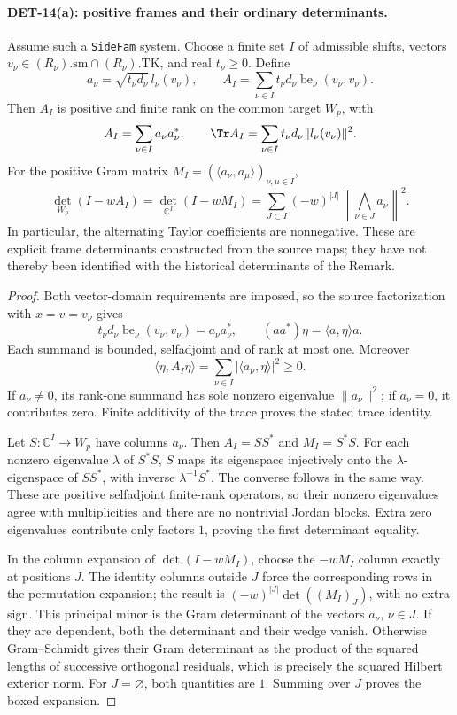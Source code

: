 \paragraph{DET-14(a): positive frames and their ordinary determinants.}
Assume such a \texttt{SideFam} system. Choose a finite set \(I\) of
admissible shifts, vectors
\(v_\nu\in(R_\nu).\mathrm{sm}\cap(R_\nu).\mathrm{TK}\), and
real \(t_\nu\ge0\). Define
\[
 a_\nu=\sqrt{t_\nu d_\nu}\,l_\nu(v_\nu),\qquad
 A_I=\sum_{\nu\in I}t_\nu d_\nu
                \operatorname{be}_\nu(v_\nu,v_\nu).
\]
Then \(A_I\) is positive and finite rank on the common target \(W_p\),
with
\[
 A_I=\sum_{\nu\in I}a_\nu a_\nu^*,\qquad
 \Tr A_I=\sum_{\nu\in I}t_\nu d_\nu\|l_\nu(v_\nu)\|^2.
\]
For the positive Gram matrix
\(M_I=(\langle a_\nu,a_\mu\rangle)_{\nu,\mu\in I}\),
\[
 \boxed{\quad
 \det_{W_p}(I-wA_I)=\det_{\mathbb C^I}(I-wM_I)
 =\sum_{J\subset I}(-w)^{|J|}
       \left\|\bigwedge_{\nu\in J}a_\nu\right\|^2.\quad}
\]
In particular, the alternating Taylor coefficients are nonnegative.
These are explicit frame determinants constructed from the source
maps; they have not thereby been identified with the historical
determinants of the Remark.
\begin{proof}
Both vector-domain requirements are imposed, so the source
factorization with \(x=v=v_\nu\) gives
\[
 t_\nu d_\nu\operatorname{be}_\nu(v_\nu,v_\nu)
 =a_\nu a_\nu^*,\qquad
 (aa^*)\eta=\langle a,\eta\rangle a.
\]
Each summand is bounded, selfadjoint and of rank at most one.
Moreover
\[
 \langle\eta,A_I\eta\rangle
 =\sum_{\nu\in I}|\langle a_\nu,\eta\rangle|^2\ge0.
\]
If \(a_\nu\ne0\), its rank-one summand has sole nonzero eigenvalue
\(\|a_\nu\|^2\); if \(a_\nu=0\), it contributes zero. Finite
additivity of the trace proves the stated trace identity.

Let \(S:\mathbb C^I\to W_p\) have columns \(a_\nu\).
Then \(A_I=SS^*\) and \(M_I=S^*S\).
For each nonzero eigenvalue \(\lambda\) of \(S^*S\), \(S\) maps its
eigenspace injectively onto the \(\lambda\)-eigenspace of \(SS^*\),
with inverse \(\lambda^{-1}S^*\). The converse follows in the
same way. These are positive selfadjoint finite-rank operators,
so their nonzero eigenvalues agree with multiplicities and there
are no nontrivial Jordan blocks. Extra zero eigenvalues contribute
only factors \(1\), proving the first determinant equality.

In the column expansion of \(\det(I-wM_I)\), choose the
\(-wM_I\) column exactly at positions \(J\).
The identity columns outside \(J\) force the corresponding rows
in the permutation expansion; the result is
\((-w)^{|J|}\det((M_I)_J)\), with no extra sign.
This principal minor is the Gram determinant of the vectors
\(a_\nu\), \(\nu\in J\). If they are dependent, both the determinant
and their wedge vanish. Otherwise Gram--Schmidt gives their
Gram determinant as the product of the squared lengths of successive
orthogonal residuals, which is precisely the squared Hilbert
exterior norm. For \(J=\varnothing\), both quantities are \(1\).
Summing over \(J\) proves the boxed expansion.
\end{proof}
